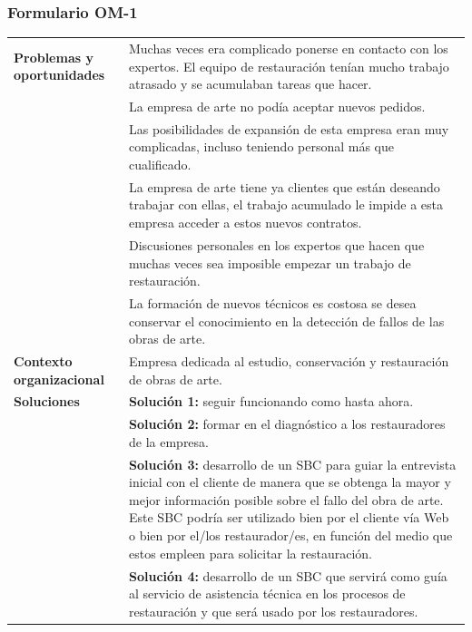 \documentclass[a4paper,11pt]{article}
\begin{document}
			\subsubsection{Formulario OM-1}
			\begin{center}
				\begin{tabular}{| p{2.9cm} | p{8.5cm} |}
					\hline
					\textbf{Problemas y oportunidades} &
					Muchas veces era complicado ponerse en contacto con los expertos. El equipo
					de restauración tenían mucho trabajo atrasado y se acumulaban tareas que hacer.\\
					& La empresa de arte no podía aceptar nuevos pedidos.\\
					& Las posibilidades de expansión de esta empresa eran muy complicadas,
					incluso teniendo personal más que cualificado.\\
					& La empresa de arte tiene ya clientes que están deseando trabajar con
					ellas, el trabajo acumulado le impide a esta empresa acceder a estos nuevos
					contratos.\\
					& Discusiones personales en los expertos que hacen que muchas veces sea
					imposible empezar un trabajo de restauración.\\
					& La formación de nuevos técnicos es costosa se desea conservar el
					conocimiento en la detección de fallos de las obras de arte.\\
					\hline
					\textbf{Contexto organizacional} &
					Empresa dedicada al estudio, conservación y restauración de obras de arte.\\
					\hline
					\textbf{Soluciones} & \textbf{Solución 1:} seguir funcionando como hasta ahora.\\
					& \textbf{Solución 2:} formar en el diagnóstico a los restauradores de la empresa.\\
					& \textbf{Solución 3:} desarrollo de un SBC para guiar la entrevista inicial con el cliente de manera que se obtenga la mayor y mejor información posible sobre el fallo del obra de arte. Este SBC podría ser utilizado bien por el cliente vía Web o bien por el/los restaurador/es, en función del medio que estos empleen para solicitar la restauración.\\
					& \textbf{Solución 4:} desarrollo de un SBC que servirá como guía al servicio de asistencia técnica en los procesos de restauración y que será usado por los restauradores.\\
					\hline
				\end{tabular}
			\end{center}
			\newpage
\end{document}
